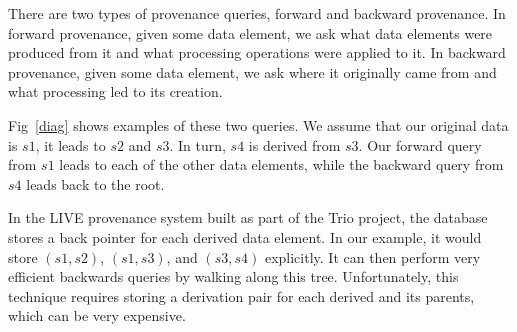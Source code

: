 
% 
% 
% 
% 
% 
% 


There are two types of provenance queries, forward and backward provenance. In forward provenance, given some data element, we ask what data elements were produced from it and what processing operations were applied to it. In backward provenance, given some data element, we ask where it originally came from and what processing led to its creation. 

Fig~\ref{diag} shows examples of these two queries. We assume that our original data is $s1$, it leads to $s2$ and $s3$. In turn, $s4$ is derived from $ s3$. Our forward query from $ s1$ leads to each of the other data elements, while the backward query from  $s4$ leads back to the root.  

In the LIVE provenance system built as part of the Trio project, the database stores a back pointer for each derived data element. In our example, it would store $(s1, s2)$, $(s1, s3)$, and $(s3, s4)$ explicitly. It can then perform very efficient backwards queries by walking along this tree. Unfortunately, this technique requires storing a derivation pair for each derived and its parents, which can be very expensive.  

